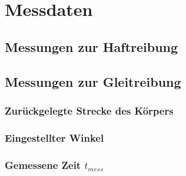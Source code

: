 \section{Messdaten}

\subsection{Messungen zur Haftreibung}

\subsection{Messungen zur Gleitreibung}

\subsubsection{Zurückgelegte Strecke des Körpers}

\subsubsection{Eingestellter Winkel}

\subsubsection{Gemessene Zeit $t_{mess}$}